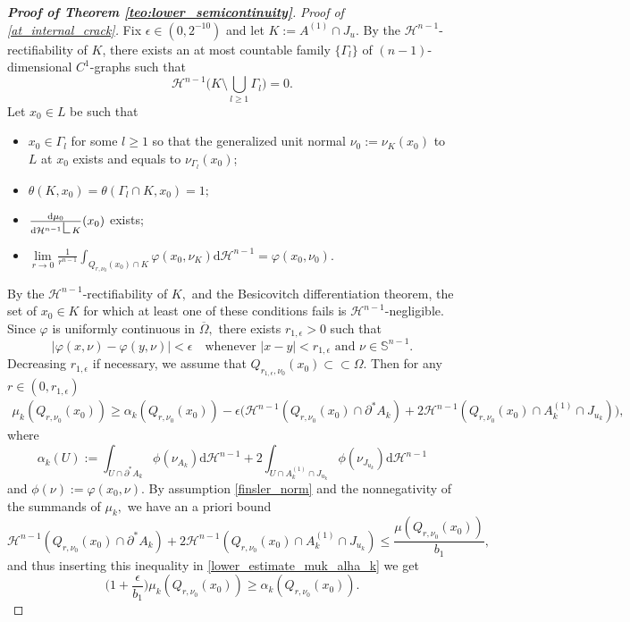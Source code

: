\documentclass[reqno]{amsart}
\numberwithin{equation}{section}
\theoremstyle{plain}
\theoremstyle{definition}
\renewcommand{\S}{\mathbb{S}}
\newcommand{\cH}{\mathcal{H}}
\newcommand{\p}{\partial}
\newcommand{\cl}[1]{\overline{#1}}
\newcommand{\bound}{b}
\renewcommand{\d}{\mathrm{d}}
\newcommand{\strictlyincluded}{\subset\subset}
\newcommand{\res}{\mathop{\hbox{\vrule height 9pt width 0.5pt depth 0pt
\vrule height 0.5pt width 5pt depth 0pt}}\nolimits}
\begin{document}
\begin{proof}[\textbf{Proof of Theorem \ref{teo:lower_semicontinuity}}]
{\it Proof of \eqref{at_internal_crack}.} Fix $\epsilon\in(0,2^{-10})$ and let $K:=A^{(1)}\cap J_u.$ By the $\cH^{n-1}$-rectifiability of $K$, there exists an at most countable family $\{\Gamma_l\}$ of $(n-1)$-dimensional $C^1$-graphs such that 
$$
\cH^{n-1}\Big(K \setminus \bigcup_{l\ge1} \Gamma_l \Big)=0.
$$
%
Let $x_0\in L$ be such that 

\begin{itemize}
 \item[($\rm a_1$)]  $x_0\in\Gamma_l$ for some $l\ge1$ so that the generalized unit normal $\nu_0:=\nu_K(x_0)$ to $L$ at $x_0 $ exists and equals to $\nu_{\Gamma_l}(x_0)$;
 
 \item[($\rm a_2$)]  $\theta(K,x_0)=\theta(\Gamma_l\cap K,x_0)=1;$ 
 
 \item[($\rm a_3$)] $\frac{\d\mu_0}{\d\cH^{n-1}\res K}(x_0)$ exists;
 
 \item[($\rm a_4$)]  $\lim\limits_{r\to0} \frac{1}{r^{n-1}} \int_{Q_{r,\nu_0}(x_0)\cap K}\varphi(x_0,\nu_K)\d\cH^{n-1} =\varphi(x_0,\nu_0).$
\end{itemize}
%
By the $\cH^{n-1}$-rectifiability of $K,$ \cite[Theorem 2.63]{AFP:2000} and the Besicovitch differentiation theorem, the set of $x_0\in K$ for which at least one of these conditions fails is $\cH^{n-1}$-negligible.
%
Since $\varphi$ is uniformly continuous in $\cl{\Omega},$ there exists $r_{1,\epsilon}>0$ such that 
\begin{equation}\label{unif_phi_contiu}
|\varphi(x,\nu) - \varphi(y,\nu)|<\epsilon \quad\text{whenever $|x-y|<r_{1,\epsilon}$ and $\nu\in\S^{n-1}.$} 
\end{equation}
%
Decreasing $r_{1,\epsilon}$ if necessary, we assume that $Q_{r_{1,\epsilon},\nu_0}(x_0)\strictlyincluded \Omega.$ Then for any $r\in(0,r_{1,\epsilon})$ 
\begin{align}
\mu_k(Q_{r,\nu_0}(x_0)) \ge \alpha_k(Q_{r,\nu_0}(x_0))
- \epsilon \Big( \cH^{n-1}(Q_{r,\nu_0}(x_0) \cap \p^*A_k) + 2\cH^{n-1}(Q_{r,\nu_0}(x_0)\cap A_k^{(1)}\cap J_{u_k})\Big), 
\label{lower_estimate_muk_alha_k}
\end{align}
%
where 
$$
\alpha_k(U):=\int_{U\cap\p^*A_k} \phi(\nu_{A_k})\d\cH^{n-1} + 2\int_{U\cap A_k^{(1)}\cap J_{u_k}} \phi(\nu_{J_{u_k}})\d\cH^{n-1}
$$
and $\phi(\nu):=\varphi(x_0,\nu).$ By assumption \eqref{finsler_norm} and the nonnegativity of the summands of $\mu_k,$ we have an a priori bound
$$
\cH^{n-1}(Q_{r,\nu_0}(x_0) \cap \p^*A_k) + 2\cH^{n-1}(Q_{r,\nu_0}(x_0)\cap A_k^{(1)}\cap J_{u_k}) \le \frac{\mu(Q_{r,\nu_0}(x_0))}{\bound_1},
$$
and thus inserting this inequality in \eqref{lower_estimate_muk_alha_k} we get
\begin{equation}\label{mu_k_below_estima}
\Big(1 + \frac{\epsilon}{\bound_1}\Big) \mu_k(Q_{r,\nu_0}(x_0)) \ge \alpha_k(Q_{r,\nu_0}(x_0)).
\end{equation}


\end{proof}
\end{document}
